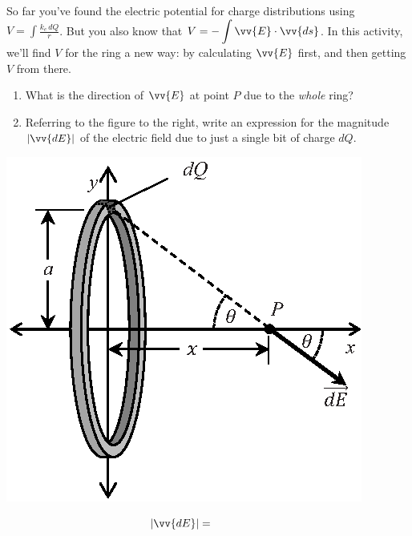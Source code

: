 \begin{minipage}{0.60\textwidth}
So far you've found the electric potential for charge distributions using 
$\displaystyle V=\int{\frac{k_e\,dQ}{r}}$.  
But you also know that 
$\displaystyle V=-\int{\vv{E} \cdot \vv{ds}}$.  
In this activity, we'll find $V$ for the ring a new way: by calculating $\vv{E}$ first, and then getting $V$ from there.

\begin{enumerate}[wide, label=(\emph{\alph*})]

\item What is the direction of $\vv{E}$ at point $P$ due to the \textit{whole} ring?
\answerspace{0.3in}

\item Referring to the figure to the right, write an expression for the magnitude $| \vv{dE} |$ of the electric field due to just a single bit of charge $dQ$.

\end{enumerate}
\end{minipage}
\begin{minipage}{0.39\textwidth}
\vspace{-0.3in}
\raggedleft \includegraphics[scale=1.0]{potential_charge_distributions/ring_E_field.eps}
\end{minipage}
$$| \vv{dE}|=\hspace{0.7in}$$
\answerspace{0.1in}

